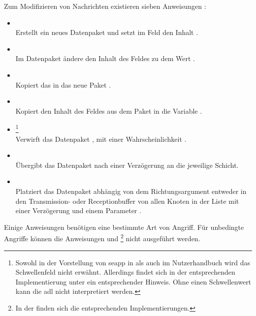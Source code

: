 \begin{definition}\label{def:aslMesssageAttacks}
	Zum Modifizieren von Nachrichten existieren sieben Anweisungen \cite[]{Tiloca2019}:
	\begin{itemize}
		\item {} \hfill \\
		Erstellt ein neues Datenpaket  und setzt im Feld  den Inhalt . 
		\item {}\hfill \\
		Im Datenpaket  ändere den Inhalt des Feldes  zu dem Wert .
		\item {}\hfill \\
		Kopiert das  in das neue Paket .
		\item {}\hfill \\
		Kopiert den Inhalt des Feldes  aus dem Paket  in die Variable .
		\item {}\footnote{Sowohl in der Vorstellung von \gls{seapp} in \citeauthor{Tiloca2019} als auch im Nutzerhandbuch \cite{SEAManual} wird das Schwellenfeld nicht erwähnt. Allerdings findet sich in der entsprechenden Implementierung unter  ein entsprechender Hinweis. Ohne einen Schwellenwert kann die \gls{adl} nicht interpretiert werden.}\hfill \\
		Verwirft das Datenpaket , mit einer Wahrscheinlichkeit .
		\item {}\hfill \\
		Übergibt das Datenpaket  nach einer Verzögerung  an die jeweilige Schicht.
		\item {}\hfill \\
		Platziert das Datenpaket  abhängig von dem Richtungsargument  entweder in den Transmission- oder Receptionbuffer von allen Knoten in der Liste  mit einer Verzögerung  und einem Parameter .
	\end{itemize}
\end{definition}

Einige Anweisungen benötigen eine bestimmte Art von Angriff. Für unbedingte Angriffe können die Anweisungen  und \footnote{In der  finden sich die entsprechenden Implementierungen.} nicht ausgeführt werden. 

